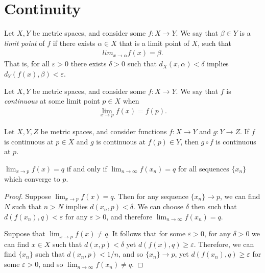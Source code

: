 \section{Continuity}

\begin{defn}
    Let $X, Y$ be metric spaces, and consider some $f: X \to Y$. We say that $\beta \in Y$ is a \emph{limit point} of $f$ if there exists $\alpha \in X$ that is a limit point of $X$, such that
    \begin{align*}
        lim_{x\to\alpha} f(x) = \beta.
    \end{align*}
    That is, for all $\varepsilon > 0$ there exists $\delta > 0$ such that $d_X(x, \alpha) < \delta$ implies $d_Y(f(x), \beta) < \varepsilon$.
\end{defn}

\begin{defn}
    Let $X, Y$ be metric spaces, and consider some $f: X \to Y$. We say that $f$ is \emph{continuous} at some limit point $p \in X$ when
    \begin{align*}
        \lim_{x\to p}f(x) = f(p).
    \end{align*}
\end{defn}

\begin{prop}
    Let $X, Y, Z$ be metric spaces, and consider functions $f: X \to Y$ and $g: Y \to Z$. If $f$ is continuous at $p \in X$ and $g$ is continuous at $f(p) \in Y$, then $g \circ f$ is continuous at $p$.
\end{prop}

\begin{thm}
    $\lim_{x\to p}f(x) = q$ if and only if $\lim_{n\to \infty}f(x_n) = q$ for all sequences $\{x_n\}$ which converge to $p$.
\end{thm}

\begin{proof}
    Suppose $\lim_{x\to p}f(x) = q$. Then for any sequence $\{x_n\} \to p$, we can find $N$ such that $n > N$ implies $d(x_n, p) < \delta$. We can choose $\delta$ then such that $d\left(f(x_n), q\right) < \varepsilon$ for any $\varepsilon > 0$, and therefore $\lim_{n\to \infty}f(x_n) = q$.

    Suppose that $\lim_{x\to p}f(x) \neq q$. It follows that for some $\varepsilon > 0$, for any $\delta > 0$ we can find $x \in X$ such that $d(x, p) < \delta$ yet $d(f(x), q) \geq \varepsilon$. Therefore, we can find $\{x_n\}$ such that $d(x_n, p) < 1/n$, and so $\{x_n\} \to p$, yet $d(f(x_n), q) \geq \varepsilon$ for some $\varepsilon > 0$, and so $\lim_{n\to \infty}f(x_n) \neq q$.
\end{proof}

